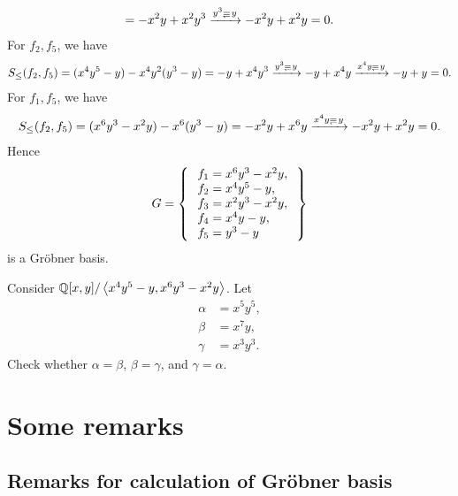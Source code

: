 \begin{example}
\begin{align*}
    =-x^2y+x^2y^3
    \xrightarrow{y^3\Denotes y}
    -x^2y+x^2y=0.
  \end{align*}
  For $f_2,f_5$, we have
  \begin{align*}
    S_{\leq}(f_2,f_5)=
    (x^4y^5-y)
    -x^4y^2(y^3-y)
    =-y+x^4y^3
\xrightarrow{y^3\Denotes y}
    -y+x^4y
\xrightarrow{x^4y\Denotes y}
    -y+y=0.
  \end{align*}
  For $f_1,f_5$, we have
  \begin{align*}
    S_{\leq}(f_2,f_5)=
    (x^6y^3-x^2y)
    -x^6(y^3-y)
    =-x^2y+x^6y
\xrightarrow{x^4y\Denotes y}
-x^2y+x^2y=0.
  \end{align*}
Hence   
\begin{align*}
  G=\Set{
    \begin{array}{l}
      f_1=x^6y^3-x^2y,\\
      f_2=x^4y^5-y,\\
      f_3=x^2y^3-x^2y,\\
      f_4=x^4y-y,\\
      f_5=y^3-y
    \end{array}
  }
\end{align*}
  is
a Gr\"obner basis.
\end{example}

\begin{quiz}
  Consider $\mathbb{Q}[x,y]/\Braket{x^4y^5-y,x^6y^3-x^2y}$.
  Let
  \begin{align*}
    \alpha &= x^5y^5,\\
    \beta &= x^7y,\\
    \gamma &= x^3y^3.
  \end{align*}
  Check whether $\alpha=\beta$, $\beta=\gamma$,
  and $\gamma=\alpha$.
\end{quiz}

\chapter{Some remarks}
\section{Remarks for calculation of Gr\"obner basis}
